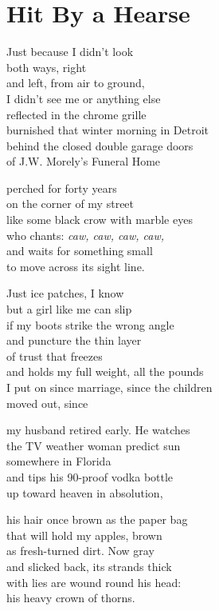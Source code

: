 \documentclass[twoside,10pt]{book}
\begin{document}
\clearpage
\section{Hit By a Hearse}

Just because I didn't look\\
both ways, right\\
and left, from air to ground,\\
I didn't see me or anything else\\
reflected in the chrome grille\\
burnished that winter morning in Detroit\\
behind the closed double garage doors\\
of J.W. Morely's Funeral Home

perched for forty years\\
on the corner of my street\\
like some black crow with marble eyes\\
who chants: \emph{caw, caw, caw, caw,\\
}and waits for something small\\
to move across its sight line.

Just ice patches, I know\\
but a girl like me can slip\\
if my boots strike the wrong angle\\
and puncture the thin layer\\
of trust that freezes\\
and holds my full weight, all the pounds\\
I put on since marriage, since the children\\
moved out, since

my husband retired early. He watches\\
the TV weather woman predict sun\\
somewhere in Florida\\
and tips his 90-proof vodka bottle\\
up toward heaven in absolution,

his hair once brown as the paper bag\\
that will hold my apples, brown\\
as fresh-turned dirt. Now gray\\
and slicked back, its strands thick\\
with lies are wound round his head:\\
his heavy crown of thorns.
\end{document}
